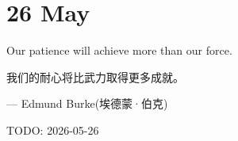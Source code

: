 \section*{26 May}
Our patience will achieve more than our force.

我们的耐心将比武力取得更多成就。\par
\hfill --- Edmund Burke(埃德蒙·伯克)\par
\hfill TODO: 2026-05-26

